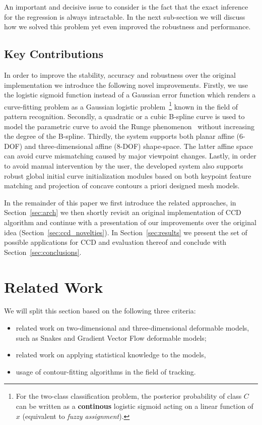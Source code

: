 \documentclass[conference]{IEEEtran}
\begin{document}
An important and decisive issue to consider is the fact that the exact inference for the
regression is always intractable. In the next sub-section we will discuss how we
solved this problem yet even improved the robustness and performance. 

\subsection{Key Contributions}
In order to improve the stability, accuracy and robustness over the original
implementation we introduce the following novel improvements. Firstly, we use 
the logistic sigmoid function instead of a Gaussian error function which renders a
curve-fitting problem as a Gaussian logistic problem~\footnote{For the two-class
classification problem, the posterior probability 
of class $C$ can be written as a \textbf{continous} logistic sigmoid acting
on a linear function of $x$ (equivalent to \textit{fuzzy assignment}).} known in the field of pattern 
recognition. Secondly, a quadratic or
a cubic B-spline curve is used to model the parametric curve
to avoid the Runge phenomenon~\cite{süli2003introduction} without increasing the degree of the
B-spline. Thirdly, the system supports both planar affine (6-DOF) and
three-dimensional affine (8-DOF) shape-space. The latter affine space can avoid
curve mismatching caused by major viewpoint changes. Lastly, in
order to avoid manual intervention by the user, the developed system
also supports robust global initial curve initialization modules based on both keypoint
feature matching and projection of concave contours a priori designed mesh models.

In the remainder of this paper we first introduce the related approaches, 
in Section~\ref{sec:arch} we then shortly revisit an original implementation of 
CCD algorithm and continue with a presentation of our improvements over the
original idea (Section~\ref{sec:ccd_novelties}). In Section~\ref{sec:results}
we present the set of possible applications for CCD and evaluation thereof and
conclude with Section~\ref{sec:conclusions}.

\section{Related Work}
\label{sec:rw}
We will split this section based on the following three criteria:
\begin{itemize}
\item related work on two-dimensional and three-dimensional deformable models,
  such as Snakes and Gradient Vector Flow deformable models;
\item related work on applying statistical knowledge to the models,
\item usage of contour-fitting algorithms in the field of tracking.
\end{itemize}
\end{document}

